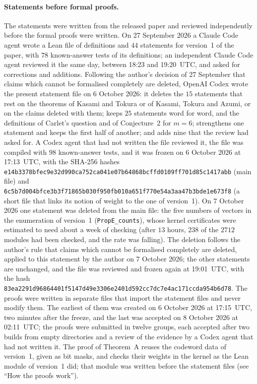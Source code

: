 \documentclass[11pt]{article}
\theoremstyle{remark}
\begin{document}
\paragraph{Statements before formal proofs.}
The statements were written from the released paper and reviewed independently
before the formal proofs were written. On 27 September 2026 a Claude Code
agent wrote a Lean file of definitions and $44$ statements for version~1 of
the paper, with $78$ known-answer tests of its definitions; an independent
Claude Code agent reviewed it the same day, between 18:23 and 19:20~UTC, and
asked for corrections and additions. Following the author's decision of
27 September that claims which cannot be formalised completely are deleted,
OpenAI Codex wrote the present statement file on 6 October 2026: it deletes
the $15$ statements that rest on the theorems of Kasami and Tokura or of
Kasami, Tokura and Azumi, or on the claims deleted with them; keeps $25$
statements word for word, and the definitions of Carlet's question and of
Conjecture~2 for $m=6$; strengthens one statement and keeps the first half of
another; and adds nine that the review had asked for. A Codex agent that
had not written the file reviewed it, the file was compiled with $98$
known-answer tests, and it was frozen on 6 October 2026 at 17:13~UTC, with the
SHA-256 hashes
\texttt{e14b3378bfec9e32d990ca752ca041e0\allowbreak 7b64868bcffd0109ff701d85c1417abb}
(main file) and
\texttt{6c5b7d004bfce3b3f71865b030f950fb\allowbreak 010a651f770e54a3aa47b3bde1e673f8}
(a short file that links its notion of weight to the one of version~1).
On 7 October 2026 one statement was deleted from the main file: the five
numbers of vectors in the enumeration of version~1 (\texttt{PropE\_counts}),
whose kernel certificates were estimated to need about a week of checking
(after $13$ hours, $238$ of the $2712$ modules had been checked, and the rate
was falling). The deletion follows the author's rule that claims which cannot be formalised
completely are deleted, applied to this statement by the author on 7 October
2026; the other statements are unchanged, and the file was reviewed and frozen
again at 19:01~UTC, with the hash
\texttt{83ea2291d96864401f5147d49e3306e2\allowbreak 401d592cc7dc7e4ac171ccda954b6d78}.
The proofs were written in separate files that import the statement files
and never modify them. The earliest of them was created on 6 October 2026 at
17:15~UTC, two minutes after the freeze, and the last was accepted on
8 October 2026 at 02:11~UTC; the proofs were submitted in twelve groups, each
accepted after two builds from empty directories and a review of the evidence
by a Codex agent that had not written it. The proof of Theorem~A reuses the
codeword data of version~1, given as bit masks, and checks their weights in
the kernel as the Lean module of version~1 did; that module was written before
the statement files (see ``How the proofs work'').
\end{document}
